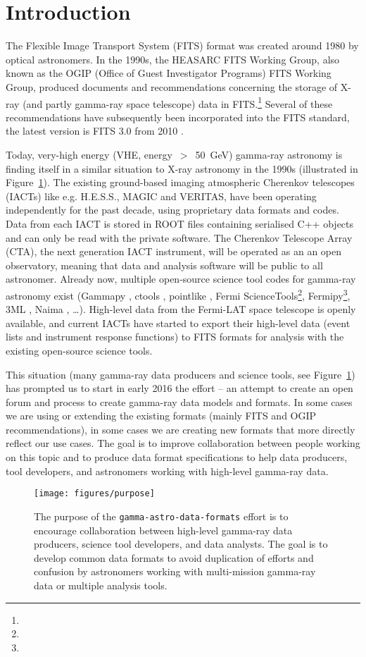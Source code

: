 \section{Introduction}

The Flexible Image Transport System (FITS) format was created around 1980 \cite{Wells:1981} by optical astronomers. In the 1990s, the HEASARC FITS Working Group, also known as the OGIP (Office of Guest Investigator Programs) FITS Working Group, produced documents and recommendations concerning the storage of X-ray (and partly gamma-ray space telescope) data in FITS.\footnote{\ogip} Several of these recommendations have subsequently been incorporated into the FITS standard, the latest version is FITS 3.0 from 2010 \cite{Pence:2010}.

Today, very-high energy (VHE, energy~$>$~50~GeV) gamma-ray astronomy is finding itself in a similar situation to X-ray astronomy in the 1990s (illustrated in Figure~\ref{fig:purpose}). The existing ground-based imaging atmospheric Cherenkov telescopes (IACTs) like e.g. H.E.S.S., MAGIC and VERITAS, have been operating independently for the past decade, using proprietary data formats and codes. Data from each IACT is stored in ROOT files containing serialised C++ objects and can only be read with the private software. The Cherenkov Telescope Array (CTA), the next generation IACT instrument, will be operated as an an open observatory, meaning that data and analysis software will be public to all astronomer. Already now, multiple open-source science tool codes for gamma-ray astronomy exist (Gammapy \cite{2015arXiv150907408D}, ctools \cite{2016AnA...593A...1K}, pointlike \citep{2010PhDT.......147K}, Fermi ScienceTools\footnote{\fermist}, Fermipy\footnote{\fermipy}, 3ML \citep{2015arXiv150708343V}, Naima \citep{2015arXiv150903319Z}, \ldots). High-level data from the Fermi-LAT space telescope is openly available, and current IACTs have started to export their high-level data (event lists and instrument response functions) to FITS formats for analysis with the existing open-source science tools.

This situation (many gamma-ray data producers and science tools, see Figure~\ref{fig:purpose}) has prompted us to start in early 2016 the \gadf effort -- an attempt to create an open forum and process to create gamma-ray data models and formats. In some cases we are using or extending the existing formats (mainly FITS and OGIP recommendations), in some cases we are creating new formats that more directly reflect our use cases. The goal is to improve collaboration between people working on this topic and to produce data format specifications to help data producers, tool developers, and astronomers working with high-level gamma-ray data.

\begin{figure}[tb]
\centerline{\texttt{[image: figures/purpose]}}
\caption{
The purpose of the \texttt{gamma-astro-data-formats} effort is to encourage collaboration between high-level gamma-ray data producers, science tool developers, and data analysts. The goal is to develop common data formats to avoid duplication of efforts and confusion by astronomers working with multi-mission gamma-ray data or multiple analysis tools.
}
\label{fig:purpose}
\end{figure}
